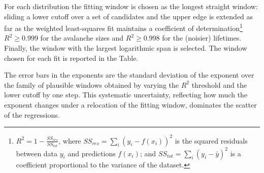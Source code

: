 \noindent For each distribution the fitting window is chosen as the longest straight window: sliding a lower cutoff over a set of candidates and the upper edge is extended as far as the weighted least-squares fit maintains a coefficient of determination\footnote{$R^2=1-\frac{SS_{res}}{SS_{tot}}$, where $SS_{res} =\sum_i(y_i-f(x_i))^2$ is the squared residuals between data $y_i$ and predictions $f(x_i)$; and $SS_{tot}=\sum_i(y_i-\bar{y})^2$ is a coefficient proportional to the variance of the dataset. }
$R^2\ge0.999$ for the avalanche sizes and $R^2\ge0.998$ for the (noisier) lifetimes. Finally, the window with the largest logarithmic span is selected. The window chosen for each fit is reported in the Table.

\noindent The error bars in the exponents are the standard deviation of the exponent over the family of plausible windows obtained by varying the $R^2$ threshold and the lower cutoff by one step. 
This systematic uncertainty, reflecting how much the exponent changes under a relocation of the fitting window, dominates the scatter of the regressions.

